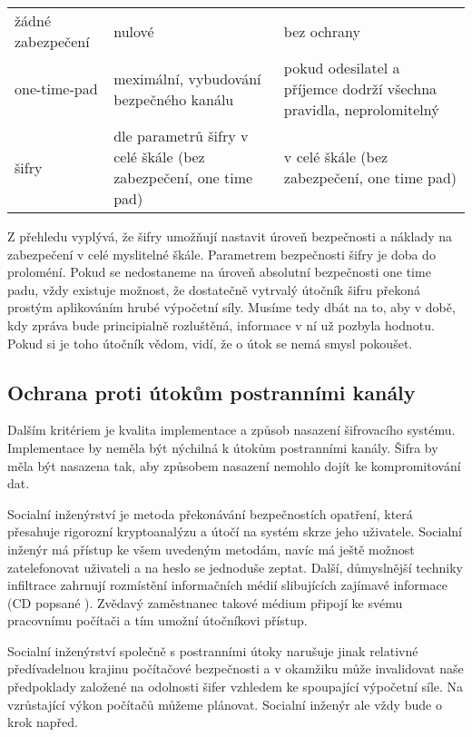 \documentclass[12pt,draft]{article}
\begin{document}
\begin{tabularx}{\linewidth}{XXX}
žádné zabezpečení & nulové & bez ochrany \\[0.25cm]
one-time-pad & meximální, vybudování bezpečného kanálu & pokud odesilatel a příjemce dodrží všechna pravidla, neprolomitelný\\[0.25cm]
šifry & dle parametrů šifry v celé škále (bez zabezpečení, one time pad) & v celé škále (bez zabezpečení, one time pad)
\end{tabularx}


Z přehledu vyplývá, že šifry umožňují nastavit úroveň bezpečnosti a náklady na zabezpečení v celé myslitelné škále. Parametrem bezpečnosti šifry je doba do proloméní. Pokud se nedostaneme na úroveň absolutní bezpečnosti one time padu, vždy existuje možnost, že dostatečně vytrvalý útočník šifru překoná prostým aplikováním hrubé výpočetní síly. Musíme tedy dbát na to, aby v době, kdy zpráva bude principialně rozluštěná, informace v ní už pozbyla hodnotu. Pokud si je toho útočník vědom, vidí, že o útok se nemá smysl pokoušet.

\subsection*{Ochrana proti útokům postranními kanály}

Dalším kritériem je kvalita implementace a způsob nasazení šifrovacího systému. Implementace by neměla být nýchilná k útokům postranními kanály. Šifra by měla být nasazena tak, aby způsobem nasazení nemohlo dojít ke kompromitování dat.

Socialní inženýrství je metoda překonávání bezpečnostích opatření, která přesahuje rigorozní kryptoanalýzu a útočí na systém skrze jeho uživatele. Socialní inženýr má přístup ke všem uvedeným metodám, navíc má ještě možnost zatelefonovat uživateli a na heslo se jednoduše zeptat. Další, důmyslnější techniky infiltrace zahrnují rozmístění informačních médií slibujících zajímavé informace
(CD popsané ). Zvědavý zaměstnanec takové médium připojí ke svému pracovnímu počítači a tím umožní útočníkovi přístup.

Socialní inženýrství společně s postranními útoky narušuje jinak relativné předívadelnou krajinu počítačové bezpečnosti a v okamžiku může invalidovat naše předpoklady založené na odolnosti šifer vzhledem ke spoupající výpočetní síle. Na vzrůstající výkon počítačů můžeme plánovat. Socialní inženýr ale vždy bude o krok napřed.
\end{document}
